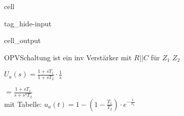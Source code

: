 \documentclass[letterpaper,10pt,english]{jupyterBook}
\begin{document}
\begin{sphinxuseclass}{cell}
\begin{sphinxuseclass}{tag_hide-input}\begin{sphinxVerbatimOutput}

\begin{sphinxuseclass}{cell_output}
\begin{sphinxVerbatim}
\end{sphinxVerbatim}

\noindent{}

\end{sphinxuseclass}\end{sphinxVerbatimOutput}

\end{sphinxuseclass}
\end{sphinxuseclass}
\sphinxAtStartPar
OPV\sphinxhyphen{}Schaltung ist ein inv Verstärker mit \(R||C\) für \(Z_1\)  \(Z_2\)

\begin{DUlineblock}{0em}
\item[] 
\end{DUlineblock}

\sphinxAtStartPar
\(U_a(s) = \frac{1 + sT_1}{1 + sT_2} \cdot \frac{1}{s}\)

\sphinxAtStartPar
\(= \frac{1 + sT_1}{s + s^2T_2} \)\\
mit Tabelle: \(u_a(t) = 1- \left(1-\frac{T_1}{T_2}\right)\cdot e^{-\frac{t}{T_2}}\)
\end{document}
